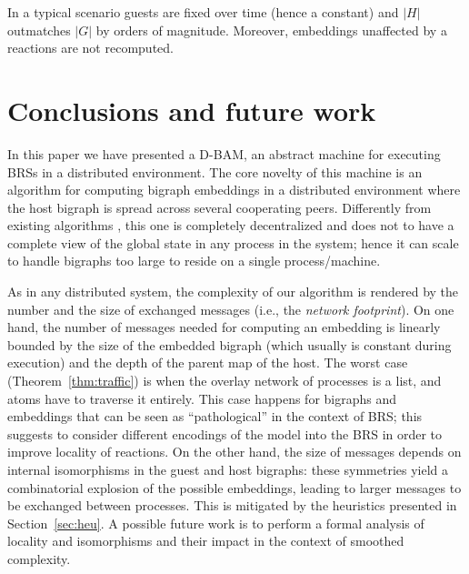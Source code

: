 \documentclass[a4paper,english,10pt]{article}
\theoremstyle{plain}\newtheorem{theorem}{Theorem}
\theoremstyle{plain}\newtheorem{corollary}[theorem]{Corollary}
\theoremstyle{plain}\newtheorem{proposition}[theorem]{Proposition}
\theoremstyle{plain}\newtheorem{lemma}[theorem]{Lemma}
\theoremstyle{plain}\newtheorem{definition}{Definition}
\theoremstyle{plain}\newtheorem{remark}{Remark}
\theoremstyle{plain}\newtheorem{example}[remark]{Example}
\newcommand{\?}[1]{}
\begin{document}
In a typical scenario guests are fixed over time (hence a constant) and
$|H|$ outmatches $|G|$ by orders of magnitude. Moreover, embeddings
unaffected by a reactions are not recomputed.

\section{Conclusions and future work}\label{sec:concl}

In this paper we have presented a D-BAM, an abstract machine for
executing BRSs in a distributed environment.  The core novelty of
this machine is an algorithm for computing bigraph embeddings in a
distributed environment where the host bigraph is spread across
several cooperating peers.  Differently from existing algorithms
\cite{gdbh:implmatch,mp:memo14,sevegnani2010sat}, this one is
completely decentralized and does not to have a complete view of the
global state in any process in the system; hence it can scale to
handle bigraphs too large to reside on a single process/machine.

As in any distributed system, the complexity of our algorithm is
rendered by the number and the size of exchanged messages (i.e., the
\emph{network footprint}).  On one hand, the number of messages needed
for computing an embedding is linearly bounded by the size of the
embedded bigraph (which usually is constant during execution) and the
depth of the parent map of the host.  The worst case
(Theorem~\ref{thm:traffic}) is when the overlay network of processes
is a list, and atoms have to traverse it entirely. This case happens
for bigraphs and embeddings that can be seen as ``pathological'' in
the context of BRS; this suggests to consider different encodings of
the model into the BRS in order to improve locality of reactions.  On
the other hand, the size of messages depends on internal isomorphisms
in the guest and host bigraphs: these symmetries yield a combinatorial
explosion of the possible embeddings, leading to larger messages to be
exchanged between processes. This is mitigated by the heuristics
presented in Section~\ref{sec:heu}.  A possible future work is to
perform a formal analysis of locality and isomorphisms and their
impact in the context of smoothed complexity.
\end{document}

